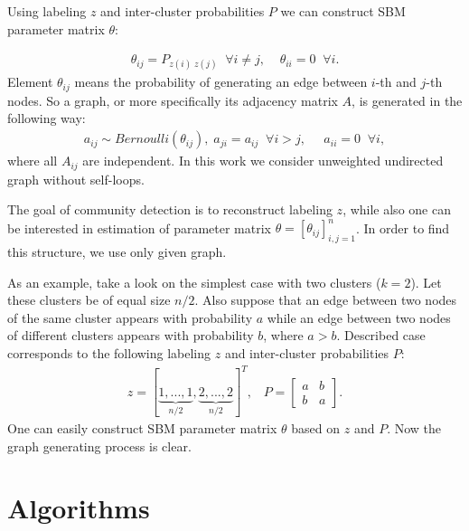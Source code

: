 \documentclass[11pt,a4paper]{extarticle}
\begin{document}
		Using labeling $z$ and inter-cluster probabilities $P$ we can construct SBM parameter matrix $\theta$:
		
		\begin{equation}
		\begin{aligned}
		\theta_{ij} = P_{z(i)\;z(j)}\;\;\forall i \neq j, \;\;\;\;\theta_{ii} = 0\;\;\forall i.
		\nonumber
		\end{aligned}
		\end{equation}
		Element $\theta_{ij}$ means the probability of generating an edge between $i$-th and $j$-th nodes.
		So a graph, or more specifically its adjacency matrix $A$, is generated in the following way:
		\begin{equation} \label{eq}
		\begin{aligned}
		a_{ij} \sim Bernoulli(\theta_{ij}) ,\; a_{ji} = a_{ij} \;\; \forall i > j,\;\;\;\;\;a_{ii} = 0\;\; \forall i,
		\end{aligned}
		\end{equation}
		where all $A_{ij}$ are independent.
		In this work we consider unweighted undirected graph without self-loops.

		The goal of community detection is to reconstruct labeling $z$, while also one can be interested in estimation of parameter matrix $\theta = [\theta_{ij}]_{i,j=1}^n$. In order to find this structure, we use only given graph.
		
		As an example, take a look on the simplest case with two clusters ($k = 2$). Let these clusters be of equal size $n/2$. Also suppose that an edge between two nodes of the same cluster appears with probability $a$ while an edge between two nodes of different clusters appears with probability $b$, where $a > b$.
		Described case corresponds to the following labeling $z$ and inter-cluster probabilities $P$:
		\begin{equation}
		\begin{aligned}
		z = [\underbrace{1, ..., 1}_{n/2}, \underbrace{2, ..., 2}_{n/2}]^T, \;\;\; P = \begin{bmatrix} a & b \\ b & a \end{bmatrix}.
		\nonumber
		\end{aligned}
		\end{equation}
		One can easily construct SBM parameter matrix $\theta$ based on $z$ and $P$. Now the graph generating process is clear.

\section{Algorithms}
	
\end{document}

